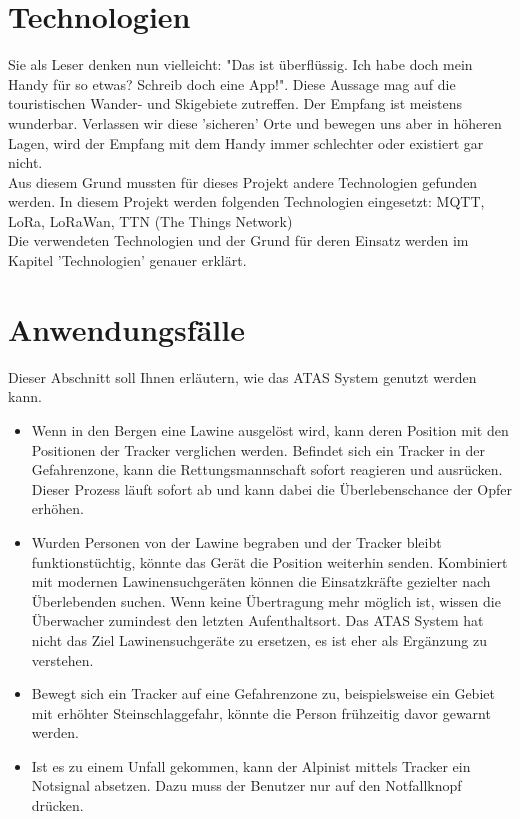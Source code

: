 \documentclass[11pt,english,german]{report}
\theoremstyle{definition}
\begin{document}
\section{Technologien}
Sie als Leser denken nun vielleicht: "Das ist überflüssig. Ich habe doch mein Handy für so etwas? Schreib doch eine App!". Diese Aussage mag auf die touristischen Wander- und Skigebiete zutreffen. Der Empfang ist meistens wunderbar. Verlassen wir diese 'sicheren' Orte und bewegen uns aber in höheren Lagen, wird der Empfang mit dem Handy immer schlechter oder existiert gar nicht. \bigskip \\
Aus diesem Grund mussten für dieses Projekt andere Technologien gefunden werden. In diesem Projekt werden folgenden Technologien eingesetzt:
\gls{MQTT}, \gls{LoRa}, \gls{LoRaWan}, \gls{TTN} (The Things Network)\bigskip \\
Die verwendeten Technologien und der Grund für deren Einsatz werden im Kapitel 'Technologien' genauer erklärt.

\section{Anwendungsfälle}
Dieser Abschnitt soll Ihnen erläutern, wie das ATAS System genutzt werden kann.
\begin{itemize}
	\item 
	Wenn in den Bergen eine Lawine ausgelöst wird, kann deren Position mit den Positionen der Tracker verglichen werden. Befindet sich ein Tracker in der Gefahrenzone, kann die Rettungsmannschaft sofort reagieren und ausrücken. Dieser Prozess läuft sofort ab und kann dabei die Überlebenschance der Opfer erhöhen. 
	\item 
	Wurden Personen von der Lawine begraben und der Tracker bleibt funktionstüchtig, könnte das Gerät die Position weiterhin senden. Kombiniert mit modernen Lawinensuchgeräten können die Einsatzkräfte gezielter nach Überlebenden suchen. Wenn keine Übertragung mehr möglich ist, wissen die Überwacher zumindest den letzten Aufenthaltsort. Das ATAS System hat nicht das Ziel Lawinensuchgeräte zu ersetzen, es ist eher als Ergänzung zu verstehen. 
	\item 
	Bewegt sich  ein Tracker auf eine Gefahrenzone zu, beispielsweise ein Gebiet mit erhöhter Steinschlaggefahr, könnte die Person frühzeitig davor gewarnt werden. 
	\item 
	Ist es zu einem Unfall gekommen, kann der Alpinist mittels Tracker ein Notsignal absetzen. Dazu muss der Benutzer nur auf den Notfallknopf drücken.
\end{itemize}
\end{document}
